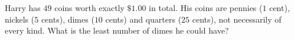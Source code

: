 Harry has $49$ coins worth exactly $\$1.00$ in total. His coins are pennies ($1$ cent), nickels ($5$ cents), dimes ($10$ cents) and quarters ($25$ cents), not necessarily of every kind. What is the least number of dimes he could have?
